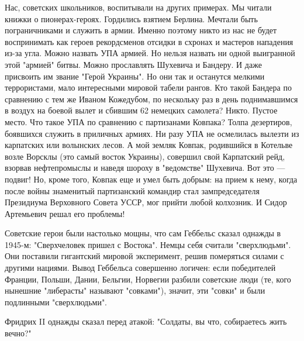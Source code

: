 Нас, советских школьников, воспитывали на других примерах. Мы читали книжки о
пионерах-героях. Гордились взятием Берлина. Мечтали быть пограничниками и
служить в армии. Именно поэтому никто из нас не будет воспринимать как героев
рекордсменов отсидки в схронах и мастеров нападения из-за угла. Можно назвать
УПА армией. Но нельзя назвать ни одной выигранной этой "армией" битвы. Можно
прославлять Шухевича и Бандеру. И даже присвоить им звание "Герой Украины". Но
они так и останутся мелкими террористами, мало интересными мировой табели
рангов. Кто такой Бандера по сравнению с тем же Иваном Кожедубом, по нескольку
раз в день поднимавшимся в воздух на боевой вылет и сбившим 62 немецких
самолета? Никто. Пустое место. Что такое УПА по сравнению с партизанами
Ковпака? Толпа дезертиров, боявшихся служить в приличных армиях. Ни разу УПА не
осмелилась вылезти из карпатских или волынских лесов. А мой земляк Ковпак,
родившийся в Котельве возле Ворсклы (это самый восток Украины), совершил свой
Карпатский рейд, взорвав нефтепромыслы и наведя шороху в "ведомстве" Шухевича.
Вот это — подвиг! Но, кроме того, Ковпак еще и умел быть добрым: на прием к
нему, когда после войны знаменитый партизанский командир стал зампредседателя
Президиума Верховного Совета УССР, мог прийти любой колхозник. И Сидор
Артемьевич решал его проблемы!

Советские герои были настолько мощны, что сам Геббельс сказал однажды в 1945-м:
"Сверхчеловек пришел с Востока". Немцы себя считали "сверхлюдьми". Они
поставили гигантский мировой эксперимент, решив померяться силами с другими
нациями. Вывод Геббельса совершенно логичен: если победителей Франции, Польши,
Дании, Бельгии, Норвегии разбили советские люди (те, кого нынешние "либерасты"
называют "совками"), значит, эти "совки" и были подлинными "сверхлюдьми".

Фридрих II однажды сказал перед атакой: "Солдаты, вы что, собираетесь жить
вечно?"

